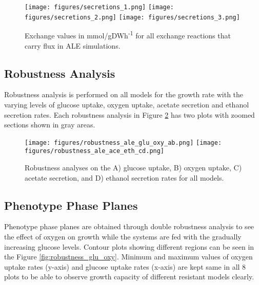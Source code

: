 \begin{figure}[H]
  \begin{center}
  \texttt{[image: figures/secretions\_1.png]}
  \texttt{[image: figures/secretions\_2.png]}
  \texttt{[image: figures/secretions\_3.png]}
  \caption[Exchange values in mmol/gDWh\textsuperscript{-1} for all exchange reactions that carry flux in ALE simulations]{Exchange values in mmol/gDWh\textsuperscript{-1} for all exchange reactions that carry flux in ALE simulations.}
  \label{fig:fba_exchanges_3}
  \end{center}
  \end{figure}
\vspace{-1.0cm}

\subsection{Robustness Analysis}

Robustness analysis is performed on all models for the growth rate with the varying levels of glucose uptake, oxygen uptake, acetate secretion and ethanol secretion rates. Each robustness analysis in Figure \ref{fig:robustness_ale} has two plots with zoomed sections shown in gray areas.

\begin{figure}[H]
  \begin{center}
  \texttt{[image: figures/robustness\_ale\_glu\_oxy\_ab.png]}
  \texttt{[image: figures/robustness\_ale\_ace\_eth\_cd.png]}
  \caption[Robustness analyses on the A) glucose uptake, B) oxygen uptake, C) acetate secretion, and D) ethanol secretion rates for all models.]{Robustness analyses on the A) glucose uptake, B) oxygen uptake, C) acetate secretion, and D) ethanol secretion rates for all models.}
  \label{fig:robustness_ale}
  \end{center}
  \end{figure}
\vspace{-2.0cm}


\subsection{Phenotype Phase Planes}

Phenotype phase planes are obtained through double robustness analysis to see the effect of oxygen on growth while the systems are fed with the gradually increasing glucose levels. Contour plots showing different regions can be seen in the Figure \ref{fig:robustness_glu_oxy}. Minimum and maximum values of oxygen uptake rates (y-axis) and glucose uptake rates (x-axis) are kept same in all 8 plots to be able to observe growth capacity of different resistant models clearly.


